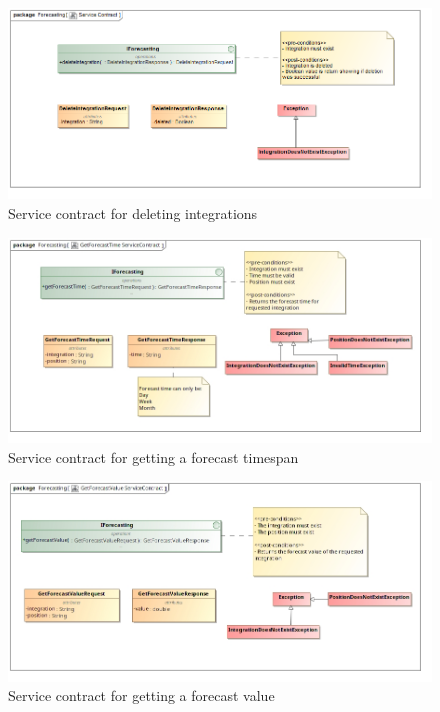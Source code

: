 \documentclass[11pt,a4paper]{article}
\begin{document}
\begin{figure}[h!]
	\includegraphics[width=\linewidth]{../Images/delete_integration_Service_Contract}
	\caption{Service contract for deleting integrations}
\end{figure}

\begin{figure}[H]
	\includegraphics[width=\linewidth]{../Images/GetForecastTime ServiceContract}
	\caption{Service contract for getting a forecast timespan}
\end{figure}

\begin{figure}[H]
	\includegraphics[width=\linewidth]{../Images/GetForecastValue ServiceContract}
	\caption{Service contract for getting a forecast value}
\end{figure}
\end{document}
